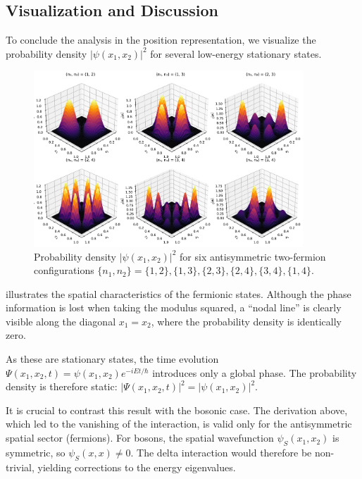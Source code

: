 \subsection{Visualization and Discussion}

To conclude the analysis in the position representation,
we visualize the probability density $|\psi(x_1, x_2)|^2$
for several low-energy stationary states.

\begin{figure}[htbp!]
	\centering
	\includegraphics[width=0.9\textwidth]{./figures/fermions_3D_collage-1.pdf}
	\caption{Probability density $|\psi(x_1, x_2)|^2$ for six antisymmetric
		two-fermion configurations $\{n_1,n_2\} = \{1,2\}, \{1,3\}, \{2,3\},
	\{2,4\}, \{3,4\}, \{1,4\}$.}
	\label{fig:fermion_3D_collage}
\end{figure}

 illustrates the spatial characteristics of
the fermionic states. Although the phase information is lost when
taking the modulus squared, a ``nodal line'' is clearly visible along
the diagonal $x_1 = x_2$, where the probability density is
identically zero.

As these are stationary states, the time evolution
$\Psi(x_1,x_2,t) = \psi(x_1,x_2)e^{-iEt/\hbar}$ introduces only a
global phase. The probability density is therefore static:
$|\Psi(x_1,x_2,t)|^2 = |\psi(x_1,x_2)|^2$.

It is crucial to contrast this result with the bosonic case.
The derivation above, which led to the vanishing of the interaction,
is valid only for the antisymmetric spatial sector (fermions).
For bosons, the spatial wavefunction $\psi_S(x_1, x_2)$ is symmetric,
so $\psi_S(x, x) \neq 0$. The delta interaction would therefore be
non-trivial, yielding corrections to the energy eigenvalues.


